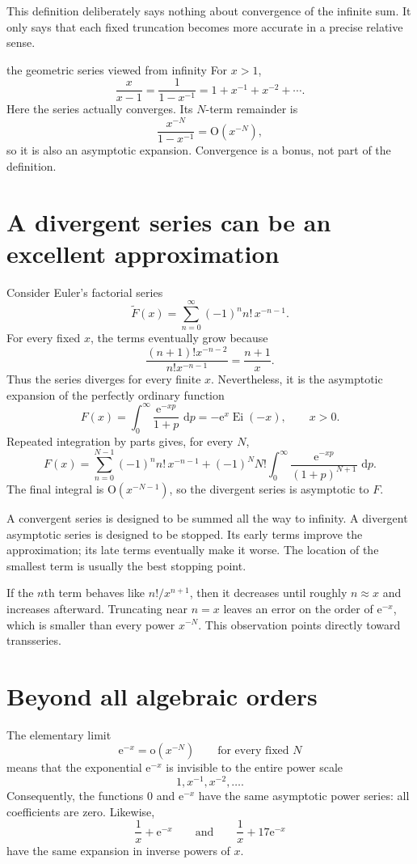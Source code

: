 \documentclass[11pt,openany]{book}
\theoremstyle{plain}
\theoremstyle{definition}
\theoremstyle{remark}
\newcommand{\Ei}{\operatorname{Ei}}
\newcommand{\smallo}{\mathrm{o}}
\newcommand{\bigO}{\mathrm{O}}
\newcommand{\dd}{\,\mathrm{d}}
\newcommand{\e}{\mathrm{e}}
\begin{document}
This definition deliberately says nothing about convergence of the infinite sum. It only says that each fixed truncation becomes more accurate in a precise relative sense.

\begin{workedbox}{the geometric series viewed from infinity}
For $x>1$,
\[
  \frac{x}{x-1}=\frac{1}{1-x^{-1}}
  =1+x^{-1}+x^{-2}+\cdots.
\]
Here the series actually converges. Its $N$-term remainder is
\[
  \frac{x^{-N}}{1-x^{-1}}=\bigO(x^{-N}),
\]
so it is also an asymptotic expansion. Convergence is a bonus, not part of the definition.
\end{workedbox}

\section{A divergent series can be an excellent approximation}
Consider Euler's factorial series
\[
  \widetilde F(x)=\sum_{n=0}^{\infty}(-1)^n n!\,x^{-n-1}.
\]
For every fixed $x$, the terms eventually grow because
\[
  \frac{(n+1)!x^{-n-2}}{n!x^{-n-1}}=\frac{n+1}{x}.
\]
Thus the series diverges for every finite $x$. Nevertheless, it is the asymptotic expansion of the perfectly ordinary function
\[
  F(x)=\int_0^\infty \frac{\e^{-xp}}{1+p}\,\dd p
      =-\e^x\Ei(-x),
  \qquad x>0.
\]
Repeated integration by parts gives, for every $N$,
\[
  F(x)=\sum_{n=0}^{N-1}(-1)^n n!\,x^{-n-1}
       +(-1)^N N!\int_0^\infty\frac{\e^{-xp}}{(1+p)^{N+1}}\,\dd p.
\]
The final integral is $\bigO(x^{-N-1})$, so the divergent series is asymptotic to $F$.

\begin{intuitionbox}
A convergent series is designed to be summed all the way to infinity. A divergent asymptotic series is designed to be stopped. Its early terms improve the approximation; its late terms eventually make it worse. The location of the smallest term is usually the best stopping point.
\end{intuitionbox}

If the $n$th term behaves like $n!/x^{n+1}$, then it decreases until roughly $n\approx x$ and increases afterward. Truncating near $n=x$ leaves an error on the order of $\e^{-x}$, which is smaller than every power $x^{-N}$. This observation points directly toward transseries.

\section{Beyond all algebraic orders}
The elementary limit
\[
  \e^{-x}=\smallo(x^{-N})\qquad\text{for every fixed }N
\]
means that the exponential $\e^{-x}$ is invisible to the entire power scale
\[
  1,x^{-1},x^{-2},\ldots.
\]
Consequently, the functions $0$ and $\e^{-x}$ have the same asymptotic power series: all coefficients are zero. Likewise,
\[
  \frac{1}{x}+\e^{-x}
  \qquad\text{and}\qquad
  \frac{1}{x}+17\e^{-x}
\]
have the same expansion in inverse powers of $x$.
\end{document}
